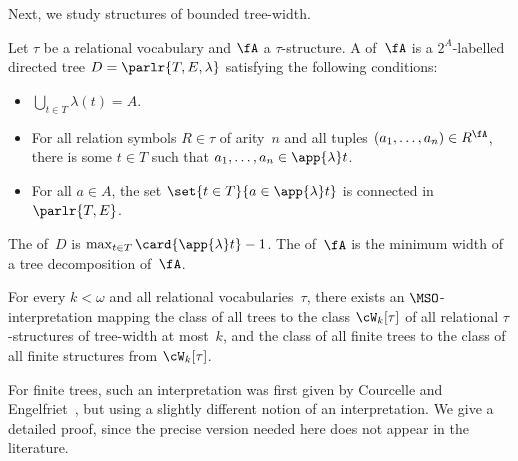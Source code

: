 \documentclass{LMCS}
\begin{document}
Next, we study structures of bounded tree-width.
\begin{defi}
Let $\tau$ be a relational vocabulary and $\fA$ a $\tau$-structure.
A  of~$\fA$
is a $2^A$-labelled directed tree $D=\parlr{T,E,\lambda}$
satisfying the following conditions\?:
\begin{itemize}
\item $\bigcup_{t\in T} \lambda(t) = A$.
\item For all relation symbols $R\in\tau$ of arity~$n$ and all tuples
  $(a_1,\dots, a_n) \in R^\fA$,
  there is some $t\in T$ such that $a_1,\ldots,a_n \in \app{\lambda}t$.
\item For all $a\in A$,
  the set $\set{ t\in T }{ a\in\app{\lambda}t }$
  is connected in $\parlr{T,E}$.
\end{itemize}
The  of~$D$ is $\max_{t\in T} {\card{\app{\lambda}t}} - 1$.
The  of~$\fA$ is the minimum width
of a tree decomposition of~$\fA$.
\end{defi}

\begin{lem}\label{lem: interpretation for bounded twd}
For every $k < \omega$ and all relational vocabularies~$\tau$,
there exists an $\MSO$-interpretation
mapping the class of all trees to the class $\cW_k[\tau]$
of all relational $\tau$-structures of tree-width at most~$k$,
and the class of all finite trees 
to the class of all finite structures from $\cW_k[\tau]$. 
\end{lem}
\proof
For finite trees, such an interpretation was first given
by Courcelle and Engelfriet~\cite{CourcelleEngelfriet95},
but using a slightly different notion of an interpretation.
We give a detailed proof, since the precise version needed here
does not appear in the literature.
\end{document}
